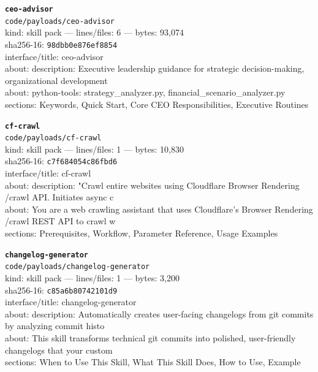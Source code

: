 \noindent\textbf{\texttt{ceo-advisor}}\\
\texttt{code/payloads/ceo-advisor}\\
kind: skill pack --- lines/files: 6 --- bytes: 93,074\\
sha256-16: \texttt{98dbb0e876ef8854}\\
interface/title: ceo-advisor\\
about: description: Executive leadership guidance for strategic decision-making, organizational development\\
about: python-tools: strategy\_analyzer.py, financial\_scenario\_analyzer.py\\
sections: Keywords, Quick Start, Core CEO Responsibilities, Executive Routines\\
\vspace*{6.0pt}

\noindent\textbf{\texttt{cf-crawl}}\\
\texttt{code/payloads/cf-crawl}\\
kind: skill pack --- lines/files: 1 --- bytes: 10,830\\
sha256-16: \texttt{c7f684054c86fbd6}\\
interface/title: cf-crawl\\
about: description: "Crawl entire websites using Cloudflare Browser Rendering /crawl API. Initiates async c\\
about: You are a web crawling assistant that uses Cloudflare's Browser Rendering /crawl REST API to crawl w\\
sections: Prerequisites, Workflow, Parameter Reference, Usage Examples\\
\vspace*{6.0pt}

\noindent\textbf{\texttt{changelog-generator}}\\
\texttt{code/payloads/changelog-generator}\\
kind: skill pack --- lines/files: 1 --- bytes: 3,200\\
sha256-16: \texttt{c85a6b80742101d9}\\
interface/title: changelog-generator\\
about: description: Automatically creates user-facing changelogs from git commits by analyzing commit histo\\
about: This skill transforms technical git commits into polished, user-friendly changelogs that your custom\\
sections: When to Use This Skill, What This Skill Does, How to Use, Example\\
\vspace*{6.0pt}
\newpage

